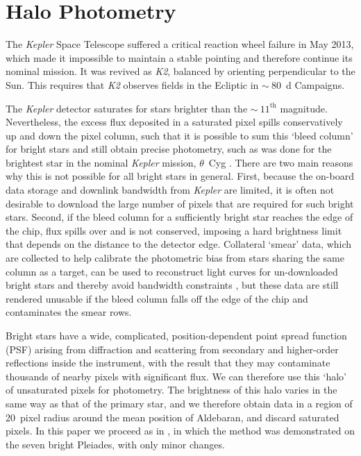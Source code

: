 \documentclass[modern]{aastex61}
\newcommand{\kepler}{\emph{Kepler}\xspace}
\newcommand{\ktwo}{\emph{K2}\xspace}
\begin{document}
\appendix

\section{Halo Photometry}
\label{halo}

The \kepler Space Telescope \citep{2010sci...327..977b}
suffered a critical reaction wheel failure in May 2013, which made it impossible to maintain a stable pointing and therefore continue its nominal mission. It was revived as \ktwo \citep{howell14}, balanced by orienting perpendicular to the Sun. This requires that \ktwo observes fields in the Ecliptic in $\sim~80$~d Campaigns.

The \kepler detector saturates for stars brighter than the $\sim~11^\text{th}$ magnitude. Nevertheless, the excess flux deposited in a saturated pixel spills conservatively up and down the pixel column, such that it is possible to sum this `bleed column' for bright stars and still obtain precise photometry, such as was done for the brightest star in the nominal \kepler mission, $\theta$~Cyg \citep[$V = 4.48$;][]{guzik2011,thetacygwhite,guzik2016}. There are two main reasons why this is not possible for all bright stars in general. First, because the on-board data storage and downlink bandwidth from \kepler are limited, it is often not desirable to download the large number of pixels that are required for such bright stars. Second, if the bleed column for a sufficiently bright star reaches the edge of the chip, flux spills over and is not conserved, imposing a hard brightness limit that depends on the distance to the detector edge.
Collateral `smear' data, which are collected to help calibrate the photometric bias from stars sharing the same column as a target, can be used to reconstruct light curves for un-downloaded bright stars and thereby avoid bandwidth constraints \citep{k2smear}, but these data are still rendered unusable if the bleed column falls off the edge of the chip and contaminates the smear rows.

Bright stars have a wide, complicated, position-dependent point spread function (PSF) arising from diffraction and scattering from secondary and higher-order reflections inside the instrument, with the result that they may contaminate thousands of nearby pixels with significant flux. We can therefore use this `halo' of unsaturated pixels for photometry. The brightness of this halo varies in the same way as that of the primary star, and we therefore obtain data in a region of 20~pixel radius around the mean position of Aldebaran, and discard saturated pixels.
In this paper we proceed as in \citet{White2017}, in which the method was demonstrated on the seven bright Pleiades, with only minor changes.
\end{document}
